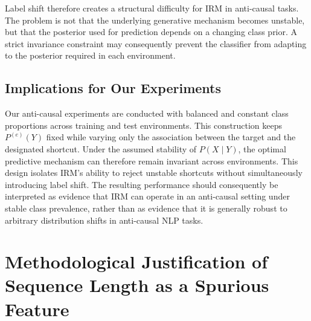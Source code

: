\documentclass[11pt]{article}
\theoremstyle{definition}
\theoremstyle{plain}
\begin{document}
Label shift therefore creates a structural difficulty for IRM in anti-causal tasks. The problem is not that the underlying generative mechanism becomes unstable, but that the posterior used for prediction depends on a changing class prior. A strict invariance constraint may consequently prevent the classifier from adapting to the posterior required in each environment.


\subsection{Implications for Our Experiments}

Our anti-causal experiments are conducted with balanced and constant class proportions across training and test environments. This construction keeps $P^{(e)}(Y)$ fixed while varying only the association between the target and the designated shortcut. Under the assumed stability of $P(X\mid Y)$, the optimal predictive mechanism can therefore remain invariant across environments. This design isolates IRM's ability to reject unstable shortcuts without simultaneously introducing label shift. The resulting performance should consequently be interpreted as evidence that IRM can operate in an anti-causal setting under stable class prevalence, rather than as evidence that it is generally robust to arbitrary distribution shifts in anti-causal NLP tasks.


\section{Methodological Justification of Sequence Length as a Spurious Feature}
\label{app:seqlen}
\end{document}

